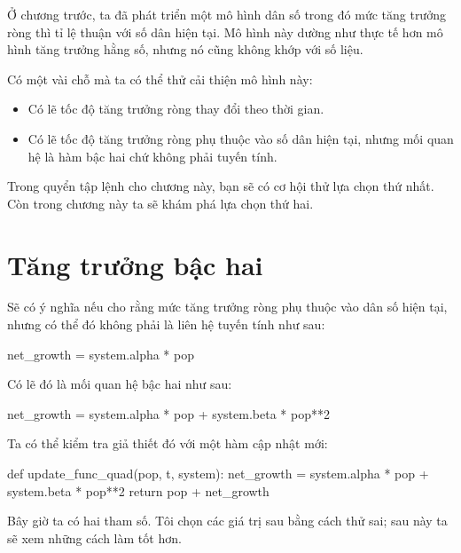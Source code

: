 \documentclass[12pt, openany]{book}
\theoremstyle{exercise}
\begin{document}
Ở chương trước, ta đã phát triển một mô hình dân số trong đó mức tăng trưởng ròng thì tỉ lệ thuận với số dân hiện tại. Mô hình này dường như thực tế hơn mô hình tăng trưởng hằng số, nhưng nó cũng không khớp với số liệu.

Có một vài chỗ mà ta có thể thử cải thiện mô hình này:

\begin{itemize}

\item Có lẽ tốc độ tăng trưởng ròng thay đổi theo thời gian.

\item Có lẽ tốc độ tăng trưởng ròng phụ thuộc vào số dân hiện tại, nhưng mối quan hệ là hàm bậc hai chứ không phải tuyến tính.

\end{itemize}

Trong quyển tập lệnh cho chương này, bạn sẽ có cơ hội thử lựa chọn thứ nhất. Còn trong chương này ta sẽ khám phá lựa chọn thứ hai.


\section{Tăng trưởng bậc hai}
\label{quadratic}

Sẽ có ý nghĩa nếu cho rằng mức tăng trưởng ròng phụ thuộc vào dân số hiện tại, nhưng có thể đó không phải là liên hệ tuyến tính như sau:

\begin{python}
    net_growth = system.alpha * pop
\end{python}

Có lẽ đó là mối quan hệ bậc hai như sau:


\begin{python}
    net_growth = system.alpha * pop + system.beta * pop**2
\end{python}

Ta có thể kiểm tra giả thiết đó với một hàm cập nhật mới:

\begin{python}
def update_func_quad(pop, t, system):
    net_growth = system.alpha * pop + system.beta * pop**2
    return pop + net_growth
\end{python}

Bây giờ ta có hai tham số. Tôi chọn các giá trị sau bằng cách thử sai; sau này ta sẽ xem những cách làm tốt hơn.

\end{document}
